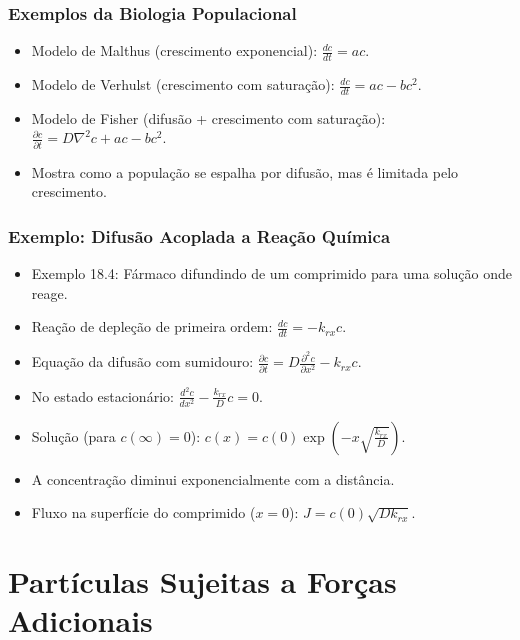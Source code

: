 \documentclass[11pt]{beamer}
\begin{document}
\begin{frame}
    \frametitle{Exemplos da Biologia Populacional}
    \begin{itemize}
        \item Modelo de Malthus (crescimento exponencial): $\frac{dc}{dt} = ac$.
        \item Modelo de Verhulst (crescimento com saturação): $\frac{dc}{dt} = ac - bc^2$.
        \item Modelo de Fisher (difusão + crescimento com saturação): $\frac{\partial c}{\partial t} = D \nabla^2 c + ac - bc^2$.
        \item Mostra como a população se espalha por difusão, mas é limitada pelo crescimento.
    \end{itemize}
\end{frame}

\begin{frame}
    \frametitle{Exemplo: Difusão Acoplada a Reação Química}
    \begin{itemize}
        \item Exemplo 18.4: Fármaco difundindo de um comprimido para uma solução onde reage.
        \item Reação de depleção de primeira ordem: $\frac{dc}{dt} = -k_{rx} c$.
        \item Equação da difusão com sumidouro: $\frac{\partial c}{\partial t} = D \frac{\partial^2 c}{\partial x^2} - k_{rx} c$.
        \item No estado estacionário: $\frac{d^2 c}{dx^2} - \frac{k_{rx}}{D} c = 0$.
        \item Solução (para $c(\infty)=0$): $c(x) = c(0) \exp\left(-x\sqrt{\frac{k_{rx}}{D}}\right)$.
        \item A concentração diminui exponencialmente com a distância.
        \item Fluxo na superfície do comprimido ($x=0$): $J = c(0)\sqrt{Dk_{rx}}$.
    \end{itemize}
\end{frame}

\section{Partículas Sujeitas a Forças Adicionais}
\end{document}
